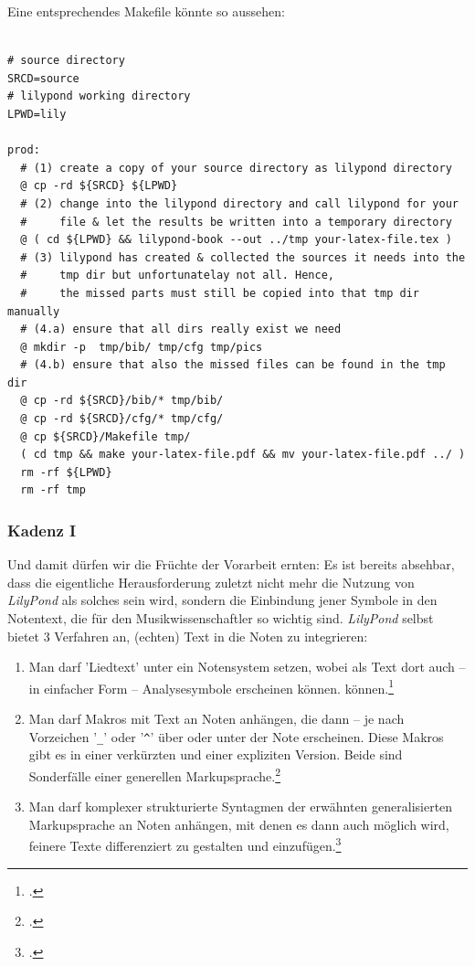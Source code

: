 Eine entsprechendes Makefile könnte so aussehen:

\begin{verbatim}

# source directory
SRCD=source
# lilypond working directory
LPWD=lily

prod: 
  # (1) create a copy of your source directory as lilypond directory 
  @ cp -rd ${SRCD} ${LPWD}
  # (2) change into the lilypond directory and call lilypond for your
  #     file & let the results be written into a temporary directory
  @ ( cd ${LPWD} && lilypond-book --out ../tmp your-latex-file.tex )
  # (3) lilypond has created & collected the sources it needs into the 
  #     tmp dir but unfortunatelay not all. Hence, 
  #     the missed parts must still be copied into that tmp dir manually
  # (4.a) ensure that all dirs really exist we need
  @ mkdir -p  tmp/bib/ tmp/cfg tmp/pics
  # (4.b) ensure that also the missed files can be found in the tmp dir
  @ cp -rd ${SRCD}/bib/* tmp/bib/
  @ cp -rd ${SRCD}/cfg/* tmp/cfg/
  @ cp ${SRCD}/Makefile tmp/
  ( cd tmp && make your-latex-file.pdf && mv your-latex-file.pdf ../ )
  rm -rf ${LPWD}
  rm -rf tmp

\end{verbatim}


\subsubsection{Kadenz I}
\label{LilyPondKadenzI}
Und damit dürfen wir die Früchte der Vorarbeit ernten: Es ist bereits
absehbar, dass die eigentliche Herausforderung zuletzt nicht mehr die Nutzung
von \textit{LilyPond} als solches sein wird, sondern die Einbindung jener
Symbole in den Notentext, die für den Musikwissenschaftler so wichtig sind.
\textit{LilyPond} selbst bietet 3 Verfahren an, (echten) Text in die Noten zu
integrieren:

\begin{enumerate}
  \item Man darf 'Liedtext' unter ein Notensystem setzen, wobei als Text dort
  auch -- in einfacher Form  -- Analysesymbole erscheinen können.
  können.\footcite[vgl.][31ff]{LilyPond2018b}
  \item Man darf Makros mit Text an Noten anhängen, die dann -- je nach
  Vorzeichen '\texttt{\_}' oder '\texttt{\^}' über oder unter der Note
  erscheinen. Diese Makros gibt es in einer verkürzten und einer expliziten
  Version. Beide sind Sonderfälle einer generellen
  Markupsprache.\footcite[vgl.][211ff]{LilyPond2018c}
  \item Man darf komplexer strukturierte Syntagmen der erwähnten generalisierten
  Markupsprache an Noten anhängen, mit denen es dann auch möglich wird, feinere
  Texte differenziert zu gestalten und
  einzufügen.\footcite[vgl.][218ff]{LilyPond2018c} 
\end{enumerate}


